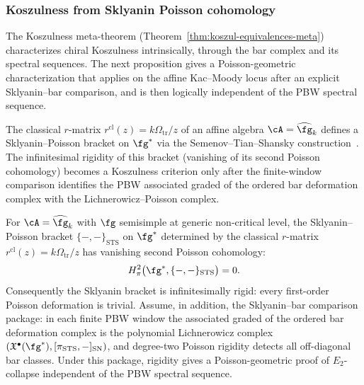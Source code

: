 \subsubsection{Koszulness from Sklyanin Poisson cohomology}
\label{subsubsec:sklyanin-poisson-koszulness}

The Koszulness meta-theorem
(Theorem~\ref{thm:koszul-equivalences-meta}) characterizes chiral
Koszulness intrinsically, through the bar complex and its spectral
sequences. The next proposition gives a Poisson-geometric
characterization that applies on the affine Kac--Moody locus after an
explicit Sklyanin--bar comparison, and is then logically independent of
the PBW spectral sequence.

The classical $r$-matrix
$r^{\mathrm{cl}}(z) = k\Omega_{\mathrm{tr}}/z$ of an affine algebra
$\cA = \widehat{\fg}_k$ defines a Sklyanin--Poisson bracket on
$\fg^*$ via the Semenov--Tian--Shansky
construction~\cite{STS83}. The infinitesimal rigidity of this
bracket (vanishing of its second Poisson cohomology) becomes a
Koszulness criterion only after the finite-window comparison identifies
the PBW associated graded of the ordered bar deformation complex with
the Lichnerowicz--Poisson complex.

\begin{theorem}
\label{thm:koszulness-from-sklyanin}

For $\cA = \widehat{\fg}_k$ with $\fg$ semisimple at generic
non-critical level, the
Sklyanin--Poisson bracket
$\{-,-\}_{\mathrm{STS}}$ on $\fg^*$ determined by the classical
$r$-matrix $r^{\mathrm{cl}}(z) = k\Omega_{\mathrm{tr}}/z$ has vanishing second
Poisson cohomology:
\[
H^2_\pi\bigl(\fg^*, \{-,-\}_{\mathrm{STS}}\bigr) = 0.
\]
Consequently the Sklyanin bracket is infinitesimally rigid: every
first-order Poisson deformation is trivial. Assume, in addition, the
Sklyanin--bar comparison package: in each finite PBW window the
associated graded of the ordered bar deformation complex is the
polynomial Lichnerowicz complex
$(\mathfrak{X}^\bullet(\fg^*),[\pi_{\mathrm{STS}},-]_{\mathrm{SN}})$,
and degree-two Poisson rigidity detects all off-diagonal bar classes.
Under this package, rigidity gives a Poisson-geometric proof of
$E_2$-collapse independent of the PBW spectral sequence.
\end{theorem}

